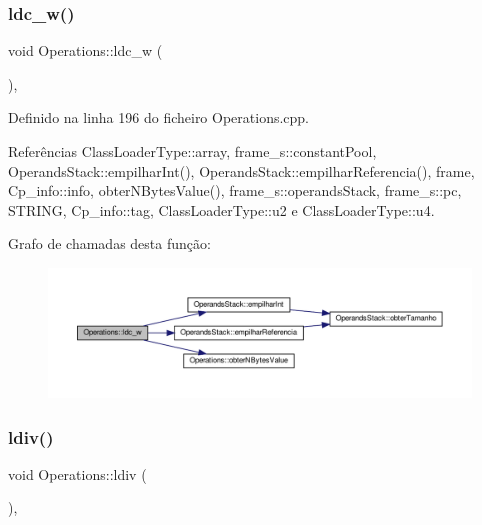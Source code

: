 \subsubsection{\texorpdfstring{ldc\+\_\+w()}{ldc\_w()}}
{\footnotesize\ttfamily void Operations\+::ldc\+\_\+w (\begin{DoxyParamCaption}{ }\end{DoxyParamCaption})\hspace{0.3cm}{\ttfamily [static]}, {\ttfamily [private]}}



Definido na linha 196 do ficheiro Operations.\+cpp.



Referências Class\+Loader\+Type\+::array, frame\+\_\+s\+::constant\+Pool, Operands\+Stack\+::empilhar\+Int(), Operands\+Stack\+::empilhar\+Referencia(), frame, Cp\+\_\+info\+::info, obter\+N\+Bytes\+Value(), frame\+\_\+s\+::operands\+Stack, frame\+\_\+s\+::pc, S\+T\+R\+I\+NG, Cp\+\_\+info\+::tag, Class\+Loader\+Type\+::u2 e Class\+Loader\+Type\+::u4.

Grafo de chamadas desta função\+:
\nopagebreak
\begin{figure}[H]
\begin{center}
\leavevmode
\includegraphics[width=350pt]{classOperations_a081fd22827f77e8ce5219275256cc831_cgraph}
\end{center}
\end{figure}
\mbox{\label{classOperations_ab9bb90a9db0433e1d04b0eb9bceea9f4}} 
\subsubsection{\texorpdfstring{ldiv()}{ldiv()}}
{\footnotesize\ttfamily void Operations\+::ldiv (\begin{DoxyParamCaption}{ }\end{DoxyParamCaption})\hspace{0.3cm}{\ttfamily [static]}, {\ttfamily [private]}}



